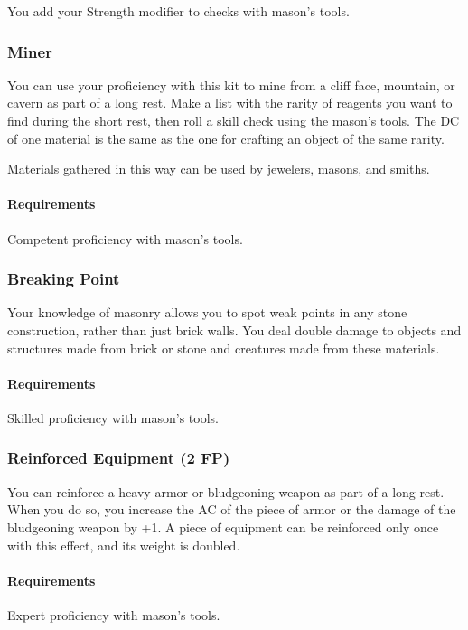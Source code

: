     You add your Strength modifier to checks with mason's tools.
\subsubsection{Miner} \label{feat::miner}
    You can use your proficiency with this kit to mine from a cliff face, mountain, or cavern as part of a long rest.
    Make a list with the rarity of reagents you want to find during the short rest, then roll a skill check using the mason's tools.
    The DC of one material is the same as the one for crafting an object of the same rarity.

    Materials gathered in this way can be used by jewelers, masons, and smiths.
    \paragraph{Requirements} Competent proficiency with mason's tools.
\subsubsection{Breaking Point} \label{feat::breakingpoint}
    Your knowledge of masonry allows you to spot weak points in any stone construction, rather than just brick walls.
    You deal double damage to objects and structures made from brick or stone and creatures made from these materials.
    \paragraph{Requirements} Skilled proficiency with mason's tools.
\subsubsection{Reinforced Equipment (2 FP)} \label{feat::reinforcedequipment}
    You can reinforce a heavy armor or bludgeoning weapon as part of a long rest.
    When you do so, you increase the AC of the piece of armor or the damage of the bludgeoning weapon by +1.
    A piece of equipment can be reinforced only once with this effect, and its weight is doubled.
    \paragraph{Requirements} Expert proficiency with mason's tools.

